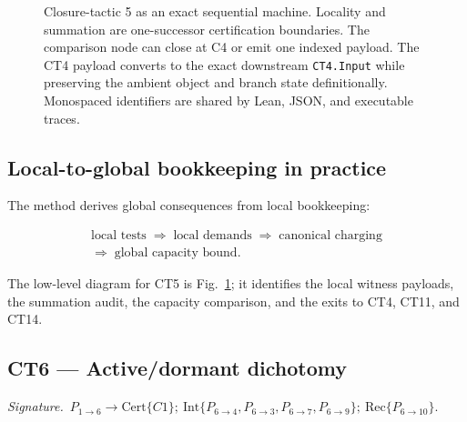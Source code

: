 \documentclass[
  11pt,
]{article}
\theoremstyle{definition}
\newcommand{\ctsignature}[1]{\par\noindent\emph{Signature.}\ #1\par\medskip}
\newcommand{\ctcert}[1]{\mathrm{Cert}\{#1\}}
\newcommand{\ctint}[1]{\mathrm{Int}\{#1\}}
\newcommand{\ctrec}[1]{\mathrm{Rec}\{#1\}}
\begin{document}
\begin{figure}[p]
{%
}
\caption[Closure-tactic 5: exact local-to-global machine]{Closure-tactic 5 as an exact sequential machine.  Locality and summation are one-successor certification boundaries.  The comparison node can close at C4 or emit one indexed payload.  The CT4 payload converts to the exact downstream \texttt{CT4.Input} while preserving the ambient object and branch state definitionally.  Monospaced identifiers are shared by Lean, JSON, and executable traces.}
\label{fig:ct5-local-global-bookkeeping}
\end{figure}
\FloatBarrier


\subsection*{Local-to-global bookkeeping in practice}

The method derives global consequences from local bookkeeping:

\[
\begin{gathered}
\text{local tests}
\;\Rightarrow\;
\text{local demands}
\;\Rightarrow\;
\text{canonical charging}\\
\Rightarrow\;
\text{global capacity bound}.
\end{gathered}
\]

The low-level diagram for CT5 is Fig.~\ref{fig:ct5-local-global-bookkeeping};
it identifies the local witness payloads, the summation audit, the
capacity comparison, and the exits to CT4, CT11, and CT14.



\subsection{CT6 --- Active/dormant dichotomy}\label{ct:6}\label{the-activedormant-dichotomy}
\ctsignature{\(P_{1\to6}\to \ctcert{C1};\ \ctint{P_{6\to4},P_{6\to3},P_{6\to7},P_{6\to9}};\ \ctrec{P_{6\to10}}\).}
\end{document}
